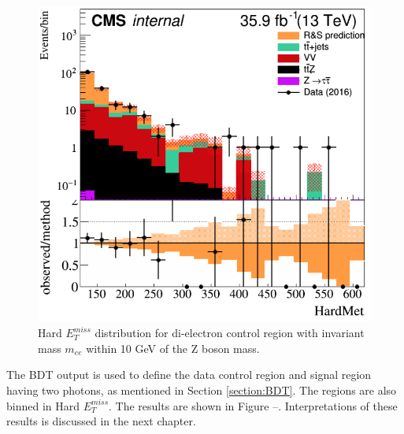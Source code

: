 \begin{figure}[h]
	\centering
	\includegraphics[width=0.9\linewidth]{Figures/eeonZhardmet}
	\caption[Hard $E_T^{miss}$ distribution for di-electron control region.]{Hard $E_T^{miss}$ distribution for di-electron control region with invariant mass $m_{ee}$ within 10 GeV of the Z boson mass.}
	\label{fig:eeonzhardmet}
\end{figure}

The BDT output is used to define the data control region and signal region having two photons, as mentioned in Section \ref{section:BDT}.  The regions are also binned in Hard $E_T^{miss}$.  The results are shown in Figure --.  Interpretations of these results is discussed in the next chapter.